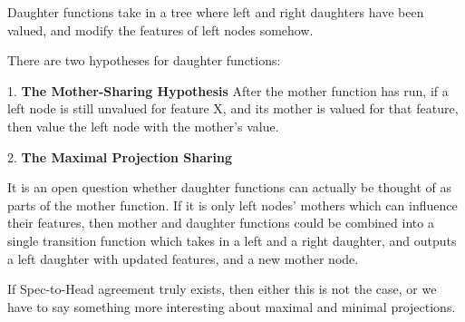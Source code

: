 
Daughter functions take in a tree where left and right daughters have been valued, and modify the features of left nodes somehow. 

There are two hypotheses for daughter functions:

1. \textbf{The Mother-Sharing Hypothesis}
After the mother function has run, if a left node is still unvalued for feature X, and its mother is valued for that feature, then value the left node with the mother's value. 

2. \textbf{The Maximal Projection Sharing}






It is an open question whether daughter functions can actually be thought of as parts of the mother function. If it is only left nodes' mothers which can influence their features, then mother and daughter functions could be combined into a single transition function which takes in a left and a right daughter, and outputs a left daughter with updated features, and a new mother node. 

If Spec-to-Head agreement truly exists, then either this is not the case, or we have to say something more interesting about maximal and minimal projections. 